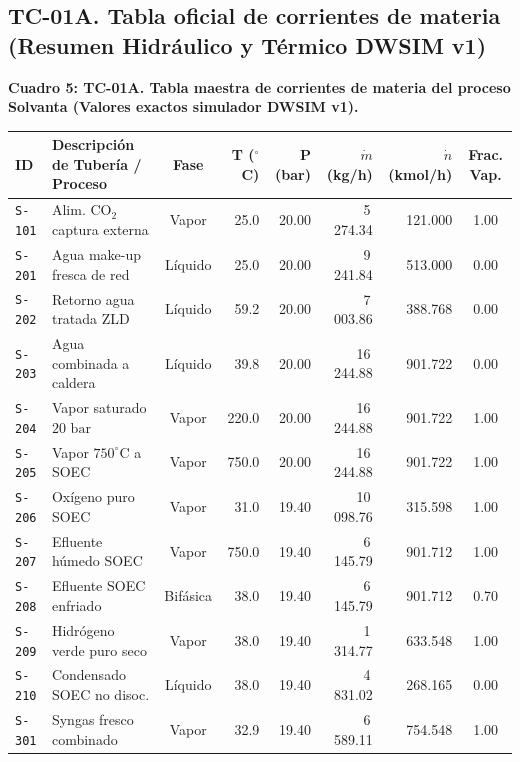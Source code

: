 \documentclass[11pt,letterpaper]{article}
\begin{document}
\clearpage
\begin{landscape}
\subsection{TC-01A. Tabla oficial de corrientes de materia (Resumen Hidráulico y Térmico DWSIM v1)}

\begin{center}
\footnotesize
\setlength{\tabcolsep}{3.2pt}
\renewcommand{\arraystretch}{0.84}
\textbf{Cuadro 5: TC-01A. Tabla maestra de corrientes de materia del proceso Solvanta (Valores exactos simulador DWSIM v1).}\\[2pt]
\begin{tabularx}{\textwidth}{lXcrrrrc}
\toprule
\textbf{ID} & \textbf{Descripción de Tubería / Proceso} & \textbf{Fase} & \textbf{T ($^\circ$C)} & \textbf{P (bar)} & \textbf{$\dot{m}$ (kg/h)} & \textbf{$\dot{n}$ (kmol/h)} & \textbf{Frac. Vap.} \\
\midrule
\texttt{S-101} & Alim. $\text{CO}_2$ captura externa & Vapor & 25.0 & 20.00 & 5\,274.34 & 121.000 & 1.00 \\
\texttt{S-201} & Agua make-up fresca de red & Líquido & 25.0 & 20.00 & 9\,241.84 & 513.000 & 0.00 \\
\texttt{S-202} & Retorno agua tratada ZLD & Líquido & 59.2 & 20.00 & 7\,003.86 & 388.768 & 0.00 \\
\texttt{S-203} & Agua combinada a caldera & Líquido & 39.8 & 20.00 & 16\,244.88 & 901.722 & 0.00 \\
\texttt{S-204} & Vapor saturado $20\text{ bar}$ & Vapor & 220.0 & 20.00 & 16\,244.88 & 901.722 & 1.00 \\
\texttt{S-205} & Vapor $750^\circ\text{C}$ a SOEC & Vapor & 750.0 & 20.00 & 16\,244.88 & 901.722 & 1.00 \\
\texttt{S-206} & Oxígeno puro SOEC & Vapor & 31.0 & 19.40 & 10\,098.76 & 315.598 & 1.00 \\
\texttt{S-207} & Efluente húmedo SOEC & Vapor & 750.0 & 19.40 & 6\,145.79 & 901.712 & 1.00 \\
\texttt{S-208} & Efluente SOEC enfriado & Bifásica & 38.0 & 19.40 & 6\,145.79 & 901.712 & 0.70 \\
\texttt{S-209} & Hidrógeno verde puro seco & Vapor & 38.0 & 19.40 & 1\,314.77 & 633.548 & 1.00 \\
\texttt{S-210} & Condensado SOEC no disoc. & Líquido & 38.0 & 19.40 & 4\,831.02 & 268.165 & 0.00 \\
\texttt{S-301} & Syngas fresco combinado & Vapor & 32.9 & 19.40 & 6\,589.11 & 754.548 & 1.00 \\

\end{tabularx}
\end{center}
\end{landscape}
\end{document}
